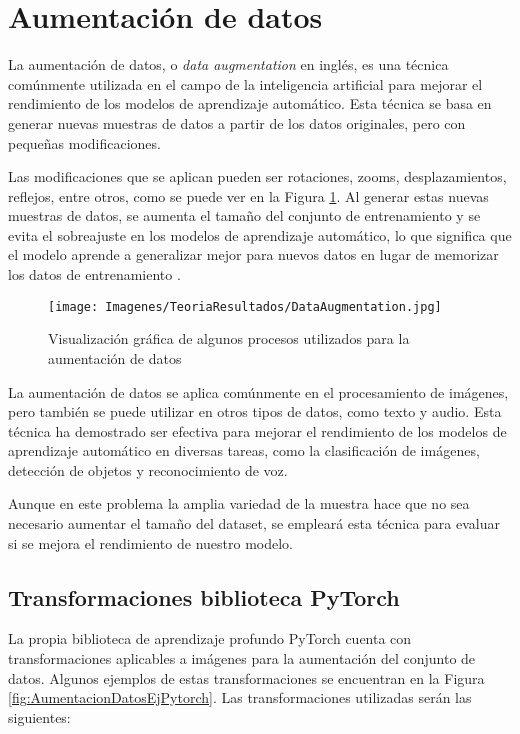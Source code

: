 \documentclass{report}
\begin{document}
\newpage
\section{Aumentación de datos}\label{AumentacionDatos}

La aumentación de datos, o \textit{data augmentation} en inglés, es una técnica comúnmente utilizada en el campo de la inteligencia artificial para mejorar el rendimiento de los modelos de aprendizaje automático. Esta técnica se basa en generar nuevas muestras de datos a partir de los datos originales, pero con pequeñas modificaciones.

Las modificaciones que se aplican pueden ser rotaciones, zooms, desplazamientos, reflejos, entre otros, como se puede ver en la Figura \ref{fig:AumentacionDatos}. Al generar estas nuevas muestras de datos, se aumenta el tamaño del conjunto de entrenamiento y se evita el sobreajuste en los modelos de aprendizaje automático, lo que significa que el modelo aprende a generalizar mejor para nuevos datos en lugar de memorizar los datos de entrenamiento \cite{EzequielCNN} \cite{DataAugmentation}.

\begin{figure}[hbpt]
	\centering
	 \texttt{[image: Imagenes/TeoriaResultados/DataAugmentation.jpg]}
	 \caption{ Visualización gráfica de algunos procesos utilizados para la aumentación de datos \cite{DataAugmentation} }
	 \label{fig:AumentacionDatos}
\end{figure}

La aumentación de datos se aplica comúnmente en el procesamiento de imágenes, pero también se puede utilizar en otros tipos de datos, como texto y audio. Esta técnica ha demostrado ser efectiva para mejorar el rendimiento de los modelos de aprendizaje automático en diversas tareas, como la clasificación de imágenes, detección de objetos y reconocimiento de voz.


Aunque en este problema la amplia variedad de la muestra hace que no sea necesario aumentar el tamaño del dataset, se empleará esta técnica para evaluar si se mejora el rendimiento de nuestro modelo.


\subsection{Transformaciones biblioteca PyTorch}


La propia biblioteca de aprendizaje profundo PyTorch cuenta con transformaciones aplicables a imágenes para la aumentación del conjunto de datos. Algunos ejemplos de estas transformaciones se encuentran en la Figura \ref{fig:AumentacionDatosEjPytorch}. Las transformaciones utilizadas serán las siguientes:
\end{document}
